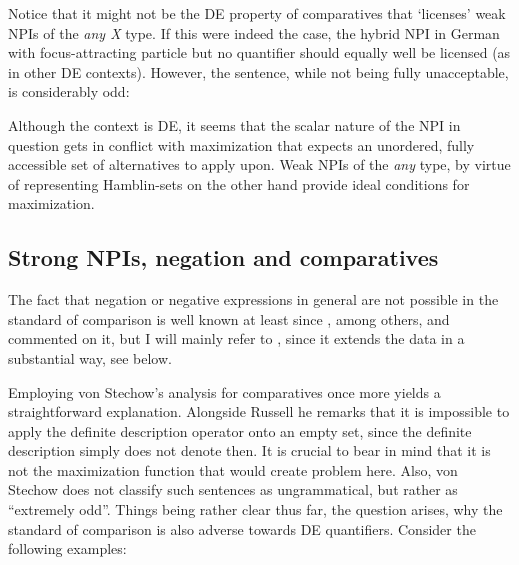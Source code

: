 \documentclass[output=paper,colorlinks,citecolor=brown,
]{langscibook}
\begin{document}
Notice that it might not be the DE property of comparatives that `licenses' weak NPIs of the \textit{any X} type. If this
were indeed the case, the hybrid NPI in German with focus-attracting particle but no quantifier should equally well be
licensed (as in other DE contexts). However, the sentence, while not being fully unacceptable, is considerably odd:

\begin{exe}
\end{exe}

Although the context is DE, it seems that the scalar nature of the NPI in question gets in conflict with maximization
that expects an unordered, fully accessible set of alternatives to apply upon. Weak NPIs of the \textit{any} type, by virtue of
representing Hamblin-sets on the other hand provide ideal conditions for maximization.

\subsection{Strong NPIs, negation and comparatives}

The fact that negation or negative expressions in general are not possible in the standard of comparison is well known
at least since \citet{lees1961}, among others, \citet{ross1980} and \citet{stechow1984} commented on it, but I will
mainly refer to \citet{lechner2002}, since it extends the data in a substantial way, see below.

\begin{sloppypar}
Employing von Stechow's analysis for comparatives once more yields a straightforward explanation. Alongside Russell he
remarks that it is impossible to apply the definite description operator onto an empty set, since the definite
description simply does not denote then. It is crucial to bear in mind that it is not the maximization function that would create
problem here. Also, von Stechow does not classify such sentences as ungrammatical, but rather as “extremely odd”.
Things being rather clear thus far, the question arises, why the standard of comparison is also adverse towards DE
quantifiers. Consider the following examples:
\end{sloppypar}
\end{document}
